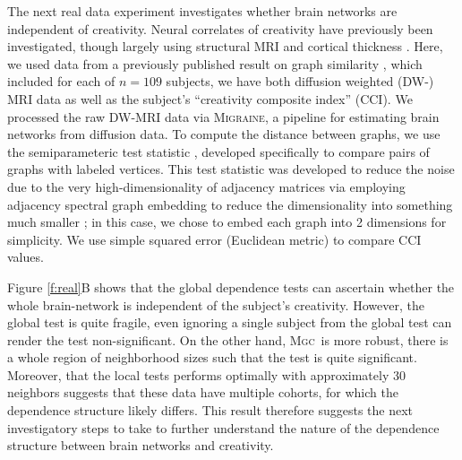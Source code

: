 \documentclass[11pt]{article}
\providecommand{\sct}[1]{{\normalfont\textsc{#1}}}
\newcommand{\Migraine}{\sct{Migraine}}
\newcommand{\mtg}{\sct{m2g}}
\newcommand{\Mgc}{\sct{Mgc}}
\begin{document}
The next real data experiment investigates whether brain networks are independent of creativity.  Neural correlates of creativity have previously been investigated, though largely using structural MRI and cortical thickness \cite{Jung2009}.  Here, we used data from a previously published result on graph similarity \cite{Koutra15a}, which included for each of $n=109$ subjects, we have both diffusion weighted (DW-) MRI data as well as the subject's ``creativity composite index'' (CCI).  We processed the raw DW-MRI data via \Migraine, a pipeline for estimating brain networks from diffusion data.   To compute the distance between graphs, we use the semiparameteric test statistic \cite{Tang2016}, developed specifically to compare pairs of graphs with labeled vertices.  This test statistic was developed to reduce the noise due to the very high-dimensionality of adjacency matrices via employing adjacency spectral graph embedding to reduce the dimensionality into something much smaller \cite{Sussman2013}; in this case, we chose to embed each graph into 2 dimensions for simplicity. We use simple squared error (Euclidean metric) to compare CCI values. 



Figure \ref{f:real}B shows that the global dependence tests can ascertain whether the whole brain-network is independent of the subject's creativity.  However, the global test is quite fragile, even ignoring a single subject from the global test can render the test non-significant. On the other hand, \Mgc~is more robust, there is a whole region of neighborhood sizes such that the test is quite significant.  Moreover, that the local tests performs optimally with approximately 30 neighbors suggests that these data have multiple cohorts, for which the dependence structure likely differs.  This result therefore suggests  the next investigatory steps to take to further understand the nature of the dependence structure between brain networks and creativity.


\end{document}
